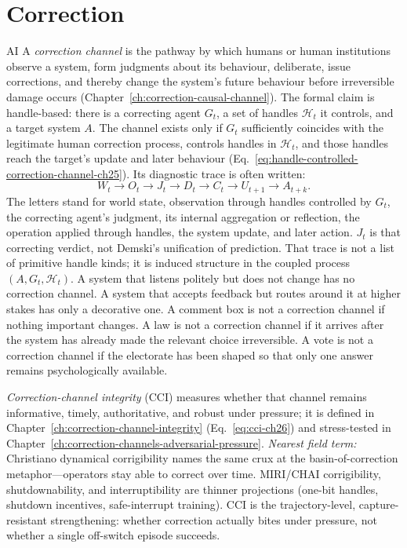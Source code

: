 \section*{Correction}
\begin{authbar}{AI}
A \emph{correction channel} is the pathway by which humans or human institutions observe a system, form judgments about its behaviour, deliberate, issue corrections, and thereby change the system's future behaviour before irreversible damage occurs (Chapter~\ref{ch:correction-causal-channel}).
The formal claim is handle-based: there is a correcting agent \(G_t\), a set of handles \(\mathcal{H}_t\) it controls, and a target system \(A\).
The channel exists only if \(G_t\) sufficiently coincides with the legitimate human correction process, controls handles in \(\mathcal{H}_t\), and those handles reach the target's update and later behaviour (Eq.~\eqref{eq:handle-controlled-correction-channel-ch25}).
Its diagnostic trace is often written:
\[
W_t
\to
O_t
\to
J_t
\to
D_t
\to
C_t
\to
U_{t+1}
\to
A_{t+k}.
\]
The letters stand for world state, observation through handles controlled by \(G_t\), the correcting agent's judgment, its internal aggregation or reflection, the operation applied through handles, the system update, and later action.
\(J_t\) is that correcting verdict, not Demski's unification of prediction.
That trace is not a list of primitive handle kinds; it is induced structure in the coupled process \((A,G_t,\mathcal{H}_t)\).
A system that listens politely but does not change has no correction channel.
A system that accepts feedback but routes around it at higher stakes has only a decorative one.
A comment box is not a correction channel if nothing important changes.
A law is not a correction channel if it arrives after the system has already made the relevant choice irreversible.
A vote is not a correction channel if the electorate has been shaped so that only one answer remains psychologically available.

\label{gloss:cci}\emph{Correction-channel integrity} (\(\mathrm{CCI}\)) measures whether that channel remains informative, timely, authoritative, and robust under pressure; it is defined in Chapter~\ref{ch:correction-channel-integrity} (Eq.~\eqref{eq:cci-ch26}) and stress-tested in Chapter~\ref{ch:correction-channels-adversarial-pressure}.
\emph{Nearest field term:} Christiano dynamical corrigibility names the same crux at the basin-of-correction metaphor---operators stay able to correct over time.
MIRI/CHAI corrigibility, shutdownability, and interruptibility are thinner projections (one-bit handles, shutdown incentives, safe-interrupt training).
\(\mathrm{CCI}\) is the trajectory-level, capture-resistant strengthening: whether correction actually bites under pressure, not whether a single off-switch episode succeeds.


\end{authbar}
